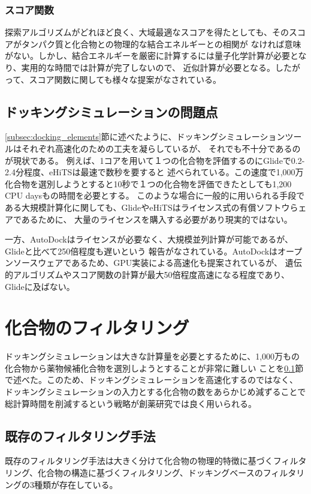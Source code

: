 \subsubsection{スコア関数}
探索アルゴリズムがどれほど良く、大域最適なスコアを得たとしても、そのスコアがタンパク質と化合物との物理的な結合エネルギーとの相関が
なければ意味がない。しかし、結合エネルギーを厳密に計算するには量子化学計算が必要となり、実用的な時間では計算が完了しないので、
近似計算が必要となる。したがって、スコア関数に関しても様々な提案がなされている。

\subsection{ドッキングシミュレーションの問題点}\label{subsec:docking_problem}
\ref{subsec:docking_elements}節に述べたように、ドッキングシミュレーションツールはそれぞれ高速化のための工夫を凝らしているが、
それでも不十分であるのが現状である。
例えば、1コアを用いて１つの化合物を評価するのにGlideで0.2-2.4分程度、eHiTSは最速で数秒を要すると
述べられている。この速度で1,000万化合物を選別しようとすると10秒で１つの化合物を評価できたとしても1,200 CPU daysもの時間を必要とする。
このような場合に一般的に用いられる手段である大規模計算化に関しても、GlideやeHiTSはライセンス式の有償ソフトウらェアであるために、
大量のライセンスを購入する必要があり現実的ではない。

一方、AutoDockはライセンスが必要なく、大規模並列計算が可能であるが、Glideと比べて250倍程度も遅いという
報告がなされている\cite{Tuccinardi2010}。AutoDockはオープンソースウェアであるため、GPU実装による高速化も提案されているが、
遺伝的アルゴリズムやスコア関数の計算が最大50倍程度高速になる程度であり\cite{Kannan2010}、Glideに及ばない。

\section{化合物のフィルタリング}
ドッキングシミュレーションは大きな計算量を必要とするために、1,000万もの化合物から薬物候補化合物を選別しようとすることが非常に難しい
ことを\ref{subsec:docking_problem}節で述べた。このため、ドッキングシミュレーションを高速化するのではなく、
ドッキングシミュレーションの入力とする化合物の数をあらかじめ減ずることで総計算時間を削減するという戦略が創薬研究では良く用いられる。

\subsection{既存のフィルタリング手法}\label{subsec:existing_filtering}
既存のフィルタリング手法は大きく分けて化合物の物理的特徴に基づくフィルタリング、化合物の構造に基づくフィルタリング、ドッキングベースのフィルタリングの3種類が存在している。
